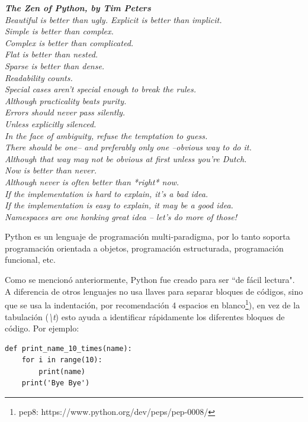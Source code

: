 \documentclass[12pt,a4paper,titlepage]{article}
\begin{document}
\itshape
\textbf{The Zen of Python, by Tim Peters}
\\
Beautiful is better than ugly.
Explicit is better than implicit.\\
Simple is better than complex.\\
Complex is better than complicated.\\
Flat is better than nested.\\
Sparse is better than dense.\\
Readability counts.\\
Special cases aren't special enough to break the rules.\\
Although practicality beats purity.\\
Errors should never pass silently.\\
Unless explicitly silenced.\\
In the face of ambiguity, refuse the temptation to guess.\\
There should be one-- and preferably only one --obvious way to do it.\\
Although that way may not be obvious at first unless you're Dutch.\\
Now is better than never.\\
Although never is often better than *right* now.\\
If the implementation is hard to explain, it's a bad idea.\\
If the implementation is easy to explain, it may be a good idea.\\
Namespaces are one honking great idea -- let's do more of those!\\ \normalfont

Python es un lenguaje de programación multi-paradigma, por lo tanto
soporta programación orientada a objetos, programación estructurada,
programación funcional, etc.

Como se mencionó anteriormente, Python fue creado para ser ``de fácil
lectura". A diferencia de otros lenguajes no usa llaves para separar
bloques de códigos, sino que se usa la indentación, por 
recomendación 4 espacios en blanco\footnote{pep8: https://www.python.org/dev/peps/pep-0008/}),
en vez de la tabulación (\textit{\textbackslash t}) esto ayuda a identificar
rápidamente los diferentes bloques de código. Por ejemplo:

\begin{lstlisting}
def print_name_10_times(name):
    for i in range(10):
        print(name)
    print('Bye Bye')
\end{lstlisting}
\end{document}
